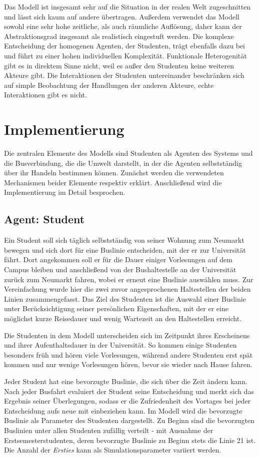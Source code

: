 \documentclass[12pt,a4paper]{scrartcl}
\begin{document}
Das Modell ist insgesamt sehr auf die Situation in der realen Welt zugeschnitten und lässt sich kaum auf andere übertragen. Außerdem verwendet das Modell sowohl eine sehr hohe zeitliche, als auch räumliche Auflösung, daher kann der Abstraktionsgrad insgesamt als realistisch eingestuft werden. Die komplexe Entscheidung der homogenen Agenten, der Studenten, trägt ebenfalls dazu bei und führt zu einer hohen individuellen Komplexität. Funktionale Heterogenität gibt es in direktem Sinne nicht, weil es außer den Studenten keine weiteren Akteure gibt. Die Interaktionen der Studenten untereinander beschränken sich auf simple Beobachtung der Handlungen der anderen Akteure, echte Interaktionen gibt es nicht.

\section{Implementierung}\label{impl}
Die zentralen Elemente des Modells sind Studenten als Agenten des Systems und die Busverbindung, die die Umwelt darstellt, in der die Agenten selbstständig über ihr Handeln bestimmen können. Zunächst werden die verwendeten Mechanismen beider Elemente respektiv erklärt. Anschließend wird die Implementierung im Detail besprochen.

\subsection{Agent: Student}\label{agent}
Ein Student soll sich täglich selbstständig von seiner Wohnung zum Neumarkt bewegen und sich dort für eine Buslinie entscheiden, mit der er zur Universität fährt. Dort angekommen soll er für die Dauer einiger Vorlesungen auf dem Campus bleiben und anschließend von der Bushaltestelle an der Universität zurück zum Neumarkt fahren, wobei er erneut eine Buslinie auswählen muss. Zur Vereinfachung wurde hier die zwei zuvor angesprochenen Haltestellen der beiden Linien zusammengefasst. 
Das Ziel des Studenten ist die Auswahl einer Buslinie unter Berücksichtigung seiner persönlichen Eigenschaften, mit der er eine möglichst kurze Reisedauer und wenig Wartezeit an den Haltestellen erreicht.

Die Studenten in dem Modell unterscheiden sich im Zeitpunkt ihres Erscheinens und ihrer Aufenthaltsdauer in der Universität. So kommen einige Studenten besonders früh und hören viele Vorlesungen, während andere Studenten erst spät kommen und nur wenige Vorlesungen hören, bevor sie wieder nach Hause fahren.

Jeder Student hat eine bevorzugte Buslinie, die sich über die Zeit ändern kann. Nach jeder Busfahrt evaluiert der Student seine Entscheidung und merkt sich das Ergebnis seiner Überlegungen, sodass er die Zufriedenheit des Vortages bei jeder Entscheidung aufs neue mit einbeziehen kann. Im Modell wird die bevorzugte Buslinie als Parameter des Studenten dargestellt. Zu Beginn sind die bevorzugten Buslinien unter allen Studenten zufällig verteilt - mit Ausnahme der Erstsemesterstudenten, deren bevorzugte Buslinie zu Beginn stets die Linie 21 ist. Die Anzahl der \textit{Ersties} kann als Simulationsparameter variiert werden.
\end{document}
